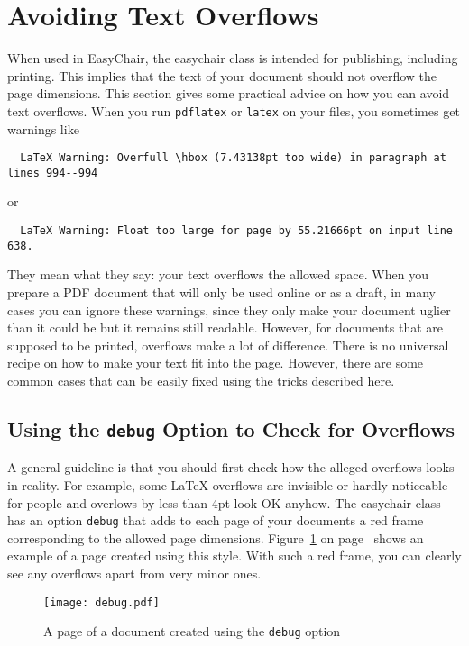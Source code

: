 \documentclass[withtimes]{easychair}
\newcommand{\easychair}{\textsf{easychair}}
\begin{document}
\section{Avoiding Text Overflows}

When used in EasyChair, the {\easychair} class is intended for
publishing, including printing. This implies that the text of your
document should not overflow the page dimensions. This section gives
some practical advice on how you can avoid text overflows. When you
run \texttt{pdflatex} or \texttt{latex} on your files, you sometimes
get warnings like

\small
\begin{verbatim}
  LaTeX Warning: Overfull \hbox (7.43138pt too wide) in paragraph at lines 994--994
\end{verbatim}
\normalsize
or

\small
\begin{verbatim}
  LaTeX Warning: Float too large for page by 55.21666pt on input line 638.
\end{verbatim}
\normalsize
They mean what they say: your text overflows the allowed space. When
you prepare a PDF document that will only be used online or as a
draft, in many cases you can ignore these warnings, since they only
make your document uglier than it could be but it remains still
readable. However, for documents that are supposed to be printed,
overflows make a lot of difference. There is no universal recipe on
how to make your text fit into the page. However, there are some
common cases that can be easily fixed using the tricks described
here. 

\subsection{Using the \texttt{debug} Option to Check for Overflows}

A general guideline is that you should first check how the alleged
overflows looks in reality. For example, some LaTeX overflows are
invisible or hardly noticeable for people and overlows by
less than 4pt look OK anyhow. The {\easychair} class has an option
\texttt{debug} that adds to each page of your documents a red frame
corresponding to the allowed page
dimensions. Figure~\ref{fig:redframe} on page~\pageref{fig:redframe}
shows an example of a page created using this style. With such a red
frame, you can clearly see any overflows apart from very minor ones.


\begin{figure}
  \begin{centering}
    \texttt{[image: debug.pdf]}
    \caption{A page of a document created using the \texttt{debug}
      option} 
    \label{fig:redframe}
  \end{centering}
\end{figure}
\end{document}
